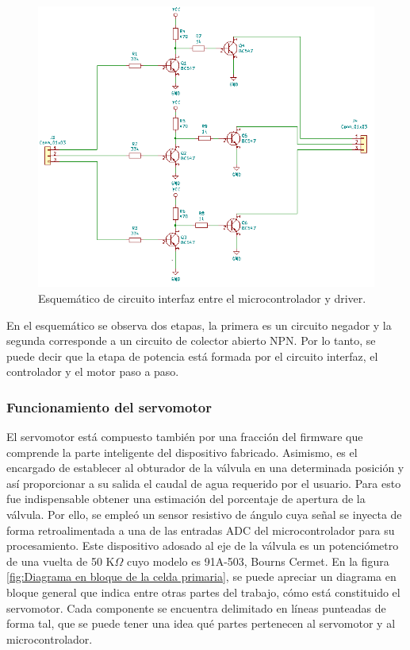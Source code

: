 \begin{figure} [htpb]
\centering
\includegraphics[scale=.85]{./Figures/esquematico-circuito-interfaz.png}
\caption{Esquemático de circuito interfaz entre el microcontrolador y driver.}
\label{fig:esquemático circuito interfaz}
\end{figure}

En el esquemático se observa dos etapas, la primera es un circuito negador y la segunda corresponde a un circuito de colector abierto NPN.
Por lo tanto, se puede decir que la etapa de potencia está formada por el circuito interfaz, el controlador y el motor paso a paso. 
\vspace{2cm}
\subsubsection{Funcionamiento del servomotor}
 
El servomotor está compuesto también por una fracción del firmware que comprende la parte inteligente del dispositivo fabricado.
Asimismo, es el encargado de establecer al obturador de la válvula en una determinada posición y así proporcionar a su salida el caudal de agua requerido por el usuario. 
Para esto fue indispensable obtener una estimación del porcentaje de apertura de la válvula. Por ello, se empleó un sensor resistivo de ángulo cuya señal se inyecta de forma retroalimentada a una de las entradas ADC del microcontrolador para su procesamiento. Este dispositivo adosado al eje de la válvula es un potenciómetro de una vuelta de 50 K$\Omega$ cuyo modelo es 91A-503, Bourns Cermet.
En la figura \ref{fig:Diagrama en bloque de la celda primaria}, se puede apreciar un diagrama en bloque general que indica entre otras partes del trabajo, cómo está constituido el servomotor. Cada componente se encuentra delimitado en líneas punteadas de forma tal, que se puede tener una idea qué partes pertenecen al servomotor y al microcontrolador.   
   

